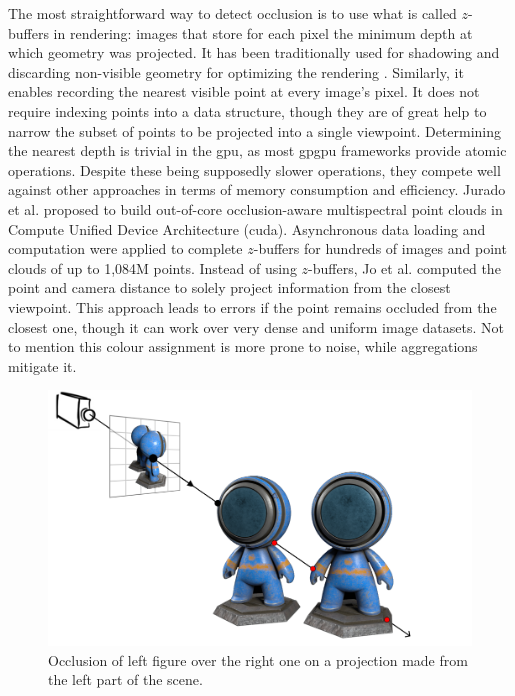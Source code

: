 The most straightforward way to detect occlusion is to use what is called $z$-buffers in rendering: images that store for each pixel the minimum depth at which geometry was projected. It has been traditionally used for shadowing and discarding non-visible geometry for optimizing the rendering \cite{akenine-moller_real-time_2018, white_cascaded_2021}. Similarly, it enables recording the nearest visible point at every image's pixel. It does not require indexing points into a data structure, though they are of great help to narrow the subset of points to be projected into a single viewpoint. Determining the nearest depth is trivial in the \acrshort{gpu}, as most \acrshort{gpgpu} frameworks provide atomic operations. Despite these being supposedly slower operations, they compete well against other approaches in terms of memory consumption and efficiency. Jurado et al. \cite{jurado_out--core_2022} proposed to build out-of-core occlusion-aware multispectral point clouds in Compute Unified Device Architecture (\acrshort{cuda}). Asynchronous data loading and computation were applied to complete $z$-buffers for hundreds of images and point clouds of up to 1,084M points. Instead of using $z$-buffers, Jo et al. \cite{jo_dense_2021} computed the point and camera distance to solely project information from the closest viewpoint. This approach leads to errors if the point remains occluded from the closest one, though it can work over very dense and uniform image datasets. Not to mention this colour assignment is more prone to noise, while aggregations mitigate it. 

\begin{figure}[ht]
	\includegraphics[width=\textwidth]{figs/fundamentals/occlusion.png}
	\caption{Occlusion of left figure over the right one on a projection made from the left part of the scene. }
    \label{fig:occlusion_concept}
\end{figure}


